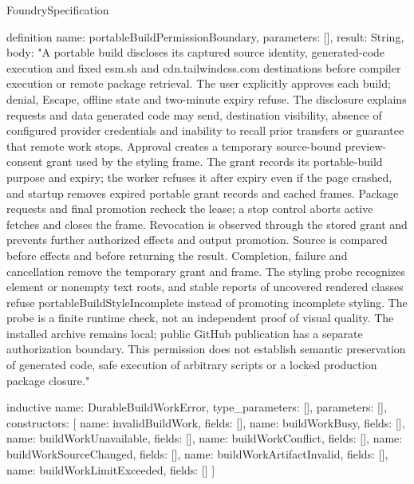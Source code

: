 \begin{lexlean}{FoundrySpecification}
\begin{semanticmodule}
definition{
  name: portableBuildPermissionBoundary,
  parameters: [],
  result: String,
  body: "A portable build discloses its captured source identity, generated-code execution and fixed esm.sh and cdn.tailwindcss.com destinations before compiler execution or remote package retrieval. The user explicitly approves each build; denial, Escape, offline state and two-minute expiry refuse. The disclosure explains requests and data generated code may send, destination visibility, absence of configured provider credentials and inability to recall prior transfers or guarantee that remote work stops. Approval creates a temporary source-bound preview-consent grant used by the styling frame. The grant records its portable-build purpose and expiry; the worker refuses it after expiry even if the page crashed, and startup removes expired portable grant records and cached frames. Package requests and final promotion recheck the lease; a stop control aborts active fetches and closes the frame. Revocation is observed through the stored grant and prevents further authorized effects and output promotion. Source is compared before effects and before returning the result. Completion, failure and cancellation remove the temporary grant and frame. The styling probe recognizes element or nonempty text roots, and stable reports of uncovered rendered classes refuse portableBuildStyleIncomplete instead of promoting incomplete styling. The probe is a finite runtime check, not an independent proof of visual quality. The installed archive remains local; public GitHub publication has a separate authorization boundary. This permission does not establish semantic preservation of generated code, safe execution of arbitrary scripts or a locked production package closure."
}

inductive{
  name: DurableBuildWorkError,
  type_parameters: [],
  parameters: [],
  constructors: [
    {name: invalidBuildWork, fields: []},
    {name: buildWorkBusy, fields: []},
    {name: buildWorkUnavailable, fields: []},
    {name: buildWorkConflict, fields: []},
    {name: buildWorkSourceChanged, fields: []},
    {name: buildWorkArtifactInvalid, fields: []},
    {name: buildWorkLimitExceeded, fields: []}
  ]
}


\end{semanticmodule}
\end{lexlean}
